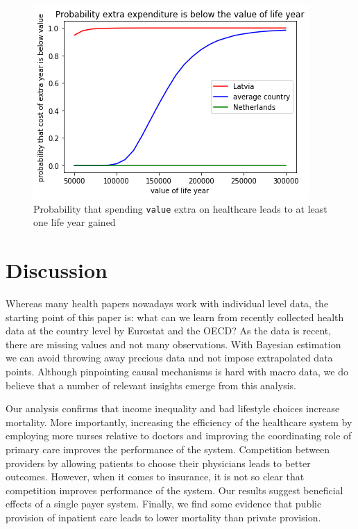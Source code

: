 \documentclass{article}
\begin{document}
\begin{figure}[htbp]
\centering
\includegraphics[width=.9\linewidth]{./figures/value_life.png}
\caption{\label{fig:org84df79c}Probability that spending \texttt{value} extra on healthcare leads to at least one life year gained}
\end{figure}


\section{Discussion}
\label{sec:org7dec181}

Whereas many health papers nowadays work with individual level data, the starting point of this paper is: what can we learn from recently collected health data at the country level by Eurostat and the OECD? As the data is recent, there are missing values and not many observations. With Bayesian estimation we can avoid throwing away precious data and not impose extrapolated data points. Although pinpointing causal mechanisms is hard with macro data, we do believe that a number of relevant insights emerge from this analysis.

Our analysis confirms that income inequality and bad lifestyle choices increase mortality. More importantly, increasing the efficiency of the healthcare system by employing more nurses relative to doctors and improving the coordinating role of primary care improves the performance of the system. Competition between providers by allowing patients to choose their physicians leads to better outcomes. However, when it comes to insurance, it is not so clear that competition improves performance of the system. Our results suggest beneficial effects of a single payer system. Finally, we find some evidence that public provision of inpatient care leads to lower mortality than private provision.
\end{document}
